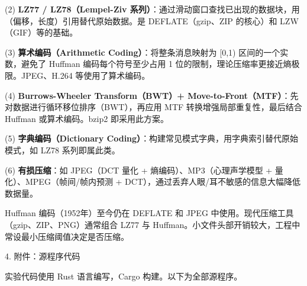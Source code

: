 \noindent\hspace*{2em}(2) \textbf{LZ77 / LZ78（Lempel-Ziv 系列）}：通过滑动窗口查找已出现的数据块，用（偏移，长度）引用替代原始数据。是 DEFLATE（gzip、ZIP 的核心）和 LZW（GIF）等的基础。\par
\noindent\hspace*{2em}(3) \textbf{算术编码（Arithmetic Coding）}：将整条消息映射为 [0,1) 区间的一个实数，避免了 Huffman 编码每个符号至少占用 1 位的限制，理论压缩率更接近熵极限。JPEG、H.264 等使用了算术编码。\par
\noindent\hspace*{2em}(4) \textbf{Burrows-Wheeler Transform（BWT）+ Move-to-Front（MTF）}：先对数据进行循环移位排序（BWT），再应用 MTF 转换增强局部重复性，最后结合 Huffman 或算术编码。bzip2 即采用此方案。\par
\noindent\hspace*{2em}(5) \textbf{字典编码（Dictionary Coding）}：构建常见模式字典，用字典索引替代原始模式，如 LZ78 系列即属此类。\par
\noindent\hspace*{2em}(6) \textbf{有损压缩}：如 JPEG（DCT 量化 + 熵编码）、MP3（心理声学模型 + 量化）、MPEG（帧间/帧内预测 + DCT），通过丢弃人眼/耳不敏感的信息大幅降低数据量。\par
\noindent\hspace*{2em}Huffman 编码（1952年）至今仍在 DEFLATE 和 JPEG 中使用。现代压缩工具（gzip、ZIP、PNG）通常组合 LZ77 与 Huffman。小文件头部开销较大，工程中常设最小压缩阈值决定是否压缩。\par
\noindent\hspace*{2em}4. 附件：源程序代码\par
\noindent\hspace*{2em}实验代码使用 Rust 语言编写，Cargo 构建。以下为全部源程序。\par
